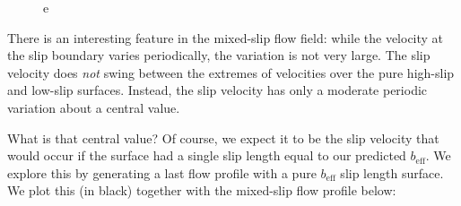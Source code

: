 \documentclass[12pt, a4paper, twoside, openright]{book}
\newcommand{\beff}{\ensuremath{b_{\mathrm{eff}}}}
\begin{document}
\begin{figure}[ht]
\centering
{}
\caption{e}\label{e}
\end{figure}

There is an interesting feature in the mixed-slip flow field: while the velocity at the slip boundary varies periodically, the variation is not very large.  The slip velocity does \emph{not} swing between the extremes of velocities over the pure high-slip and low-slip surfaces.  Instead, the slip velocity has only a moderate periodic variation about a central value.

What is that central value?  Of course, we expect it to be the slip velocity that would occur if the surface had a single slip length equal to our predicted $\beff$.
We explore this by generating a last flow profile with a pure $\beff$ slip length surface.  We plot this (in black) together with the mixed-slip flow profile below:
\end{document}
